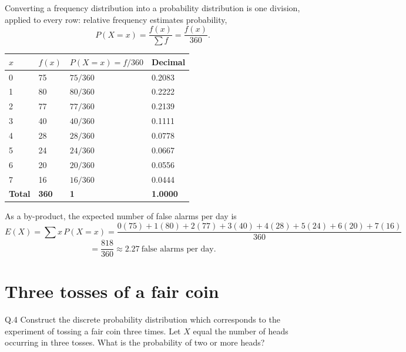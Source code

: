 \begin{solution}
Converting a frequency distribution into a probability distribution is one
division, applied to every row: relative frequency estimates probability,
\[
P(X=x)=\frac{f(x)}{\sum f}=\frac{f(x)}{360}.
\]

\begin{center}
\small\sffamily
\begin{tabular}{@{}C{2.0cm} C{2.0cm} C{2.6cm} C{2.4cm}@{}}
\toprule
$x$ & $f(x)$ & $P(X=x)=f/360$ & Decimal \\
 & 75  & $75/360$ & 0.2083 \\
1 & 80  & $80/360$ & 0.2222 \\
2 & 77  & $77/360$ & 0.2139 \\
3 & 40  & $40/360$ & 0.1111 \\
4 & 28  & $28/360$ & 0.0778 \\
5 & 24  & $24/360$ & 0.0667 \\
6 & 20  & $20/360$ & 0.0556 \\
7 & 16  & $16/360$ & 0.0444 \\
\midrule
\textbf{Total} & \textbf{360} & \textbf{1} & \textbf{1.0000} \\
\bottomrule
\end{tabular}
\end{center}


\medskip
As a by-product, the expected number of false alarms per day is
\[
E(X)=\sum x\,P(X=x)
=\frac{0(75)+1(80)+2(77)+3(40)+4(28)+5(24)+6(20)+7(16)}{360}
\]
\[
=\frac{818}{360}\approx 2.27 \ \text{false alarms per day}.
\]

\end{solution}

\section{Three tosses of a fair coin}

\begin{question}{Q.4}
Construct the discrete probability distribution which corresponds to the
experiment of tossing a fair coin three times. Let $X$ equal the number of heads
occurring in three tosses. What is the probability of two or more heads?
\end{question}

